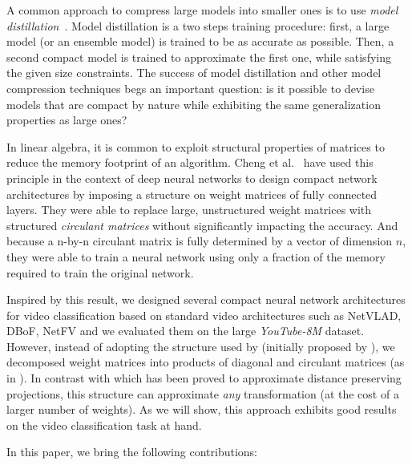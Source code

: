 \documentclass[runningheads]{llncs}
\newcommand{\yt}{\textit{YouTube-8M}\xspace}
\begin{document}
A common approach to compress large models into smaller ones is to use {\em model distillation}~\cite{44873}. Model distillation is a two steps training procedure: first, a large model (or an ensemble model) is trained to be as accurate as possible. Then, a second compact model is trained to approximate the first one, while satisfying the given size constraints. The success of model distillation and other model compression techniques begs an important question: is it possible to devise models that are compact by nature while exhibiting the same generalization properties as large ones?

In linear algebra, it is common to exploit structural properties of matrices to reduce the memory footprint of an algorithm.
Cheng et al.~\cite{7410684} have used this principle in the context of deep neural networks to design compact network architectures by imposing a structure on weight matrices of fully connected layers. They were able to replace large, unstructured weight matrices with structured \textit{circulant matrices} without significantly impacting the accuracy. And because a n-by-n circulant matrix is fully determined by a vector of dimension $n$, they were able to train a neural network using only a fraction of the memory required to train the original network.

Inspired by this result, we designed several compact neural network architectures for video classification based on standard video architectures such as NetVLAD, DBoF, NetFV and we evaluated them on the large \yt dataset. However, instead of adopting the structure used by \cite{7410684} (initially proposed by \cite{VYBIRAL20111096}), we decomposed weight matrices into products of diagonal and circulant matrices (as in \cite{schmid2000decomposing}). In contrast with \cite{VYBIRAL20111096} which has been proved to approximate distance preserving projections, this structure can approximate \textit{any} transformation (at the cost of a larger number of weights). As we will show, this approach exhibits good results on the video classification task at hand.

In this paper, we bring the following contributions:
\end{document}
